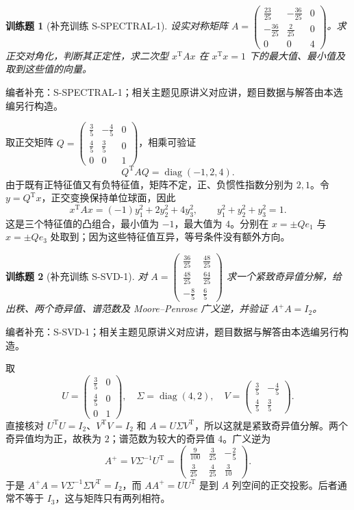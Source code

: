 \documentclass[12pt,fontset=fandol]{ctexart}
\newtheorem{exercise}{训练题}[section]
\begin{document}
\begin{exercise}[补充训练 S-SPECTRAL-1]\label{prob:S-SPECTRAL-1}
设实对称矩阵 $A=\begin{pmatrix}\frac{23}{25}&-\frac{36}{25}&0\\-\frac{36}{25}&\frac{2}{25}&0\\0&0&4\end{pmatrix}$。求正交对角化，判断其正定性，求二次型 $x^{\mathrm T}Ax$ 在 $x^{\mathrm T}x=1$ 下的最大值、最小值及取到这些值的向量。
\end{exercise}
\noindent 编者补充：S-SPECTRAL-1；相关主题见原讲义对应讲，题目数据与解答由本选编另行构造。
\begin{solve}
取正交矩阵 $Q=\begin{pmatrix}\frac{3}{5}&-\frac{4}{5}&0\\\frac{4}{5}&\frac{3}{5}&0\\0&0&1\end{pmatrix}$，相乘可验证
\[Q^{\mathrm T}AQ=\operatorname{diag}(-1,2,4).\]
由于既有正特征值又有负特征值，矩阵不定，正、负惯性指数分别为 $2,1$。令 $y=Q^{\mathrm T}x$，正交变换保持单位球面，因此
\[x^{\mathrm T}Ax=(-1)y_1^2+2y_2^2+4y_3^2,\qquad y_1^2+y_2^2+y_3^2=1.\]
这是三个特征值的凸组合，最小值为 $-1$，最大值为 $4$。分别在 $x=\pm Qe_1$ 与 $x=\pm Qe_3$ 处取到；因为这些特征值互异，等号条件没有额外方向。
\end{solve}

\begin{exercise}[补充训练 S-SVD-1]\label{prob:S-SVD-1}
对 $A=\begin{pmatrix}\frac{36}{25}&\frac{48}{25}\\\frac{48}{25}&\frac{64}{25}\\-\frac{8}{5}&\frac{6}{5}\end{pmatrix}$ 求一个紧致奇异值分解，给出秩、两个奇异值、谱范数及 Moore--Penrose 广义逆，并验证 $A^+A=I_2$。
\end{exercise}
\noindent 编者补充：S-SVD-1；相关主题见原讲义对应讲，题目数据与解答由本选编另行构造。
\begin{solve}
取
\[U=\begin{pmatrix}\frac{3}{5}&0\\\frac{4}{5}&0\\0&1\end{pmatrix},\quad\Sigma=\operatorname{diag}(4,2),\quad V=\begin{pmatrix}\frac{3}{5}&-\frac{4}{5}\\\frac{4}{5}&\frac{3}{5}\end{pmatrix}.\]
直接核对 $U^{\mathrm T}U=I_2$、$V^{\mathrm T}V=I_2$ 和 $A=U\Sigma V^{\mathrm T}$，所以这就是紧致奇异值分解。两个奇异值均为正，故秩为 $2$；谱范数为较大的奇异值 $4$。广义逆为
\[A^+=V\Sigma^{-1}U^{\mathrm T}=\begin{pmatrix}\frac{9}{100}&\frac{3}{25}&-\frac{2}{5}\\\frac{3}{25}&\frac{4}{25}&\frac{3}{10}\end{pmatrix}.\]
于是 $A^+A=V\Sigma^{-1}\Sigma V^{\mathrm T}=I_2$，而 $AA^+=UU^{\mathrm T}$ 是到 $A$ 列空间的正交投影。后者通常不等于 $I_3$，这与矩阵只有两列相符。
\end{solve}
\end{document}
